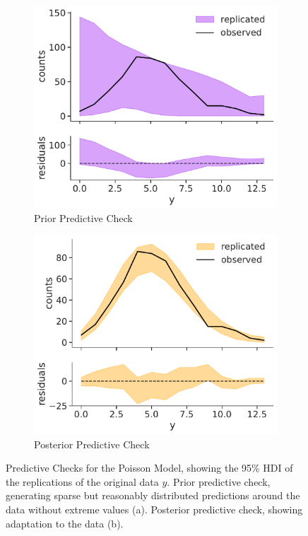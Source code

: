 \begin{figure}[t]
\begin{subfigure}[b]{0.45\linewidth}
\includegraphics[width=\linewidth]{figures/ch2/poisson/predictive_check_0.pdf}
\caption{Prior Predictive Check}
\end{subfigure}
\hfill
\begin{subfigure}[b]{0.45\linewidth}
\includegraphics[width=\linewidth]{figures/ch2/poisson/predictive_check_1.pdf}
\caption{Posterior Predictive Check}
\end{subfigure}
\caption{Predictive Checks for the Poisson Model, showing the 95\% HDI of the replications of the original data $y$.
  Prior predictive check, generating sparse but reasonably distributed predictions around the data without
extreme values (a). Posterior predictive check, showing adaptation to the data (b).}
\label{fig:pois_pc}
\end{figure}
